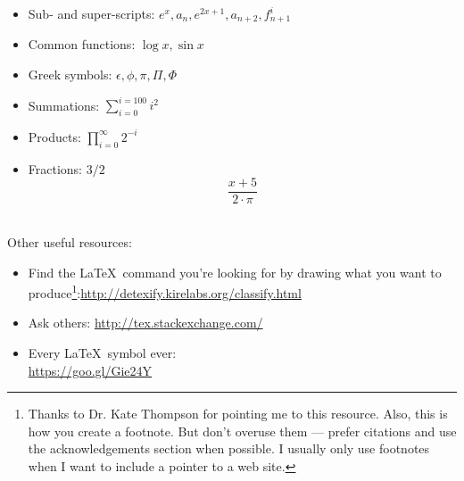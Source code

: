 \begin{itemize}
  \item Sub- and super-scripts: $e^{x}, a_{n}, e^{2x+1}, a_{n+2}, f^{i}_{n+1}$
  \item Common functions: $\log{x}, \sin{x}$
  \item Greek symbols: $\epsilon, \phi, \pi, \Pi, \Phi$ %
  \item Summations: $\sum_{i=0}^{i=100} i^{2}$ %
  \item Products: $\prod_{i=0}^{\infty} 2^{-i}$
  \item Fractions: $3/2$ %
    $$\frac{x + 5}{2 \cdot \pi}$$\\ %
\end{itemize}

\noindent Other useful resources:
\begin{itemize}
\item Find the \LaTeX~command you're looking for by drawing what you
  want to produce\footnote{Thanks to Dr. Kate Thompson for pointing me
    to this resource. Also, this is how you create a footnote. But
    don't overuse them --- prefer citations and use the
    acknowledgements section when possible. I usually only use
    footnotes when I want to include a pointer to a web
    site.}:\url{http://detexify.kirelabs.org/classify.html}
\item Ask others: \url{http://tex.stackexchange.com/}
\item Every \LaTeX~symbol ever:\\ \url{https://goo.gl/Gie24Y}

\end{itemize}


